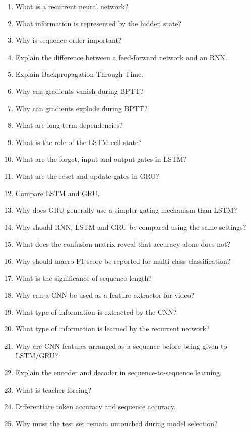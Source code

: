 \documentclass[10pt]{article}
\begin{document}
\begin{enumerate}
\item What is a recurrent neural network?
\item What information is represented by the hidden state?
\item Why is sequence order important?
\item Explain the difference between a feed-forward network and an RNN.
\item Explain Backpropagation Through Time.
\item Why can gradients vanish during BPTT?
\item Why can gradients explode during BPTT?
\item What are long-term dependencies?
\item What is the role of the LSTM cell state?
\item What are the forget, input and output gates in LSTM?
\item What are the reset and update gates in GRU?
\item Compare LSTM and GRU.
\item Why does GRU generally use a simpler gating mechanism than LSTM?
\item Why should RNN, LSTM and GRU be compared using the same settings?
\item What does the confusion matrix reveal that accuracy alone does not?
\item Why should macro F1-score be reported for multi-class classification?
\item What is the significance of sequence length?
\item Why can a CNN be used as a feature extractor for video?
\item What type of information is extracted by the CNN?
\item What type of information is learned by the recurrent network?
\item Why are CNN features arranged as a sequence before being given to LSTM/GRU?
\item Explain the encoder and decoder in sequence-to-sequence learning.
\item What is teacher forcing?
\item Differentiate token accuracy and sequence accuracy.
\item Why must the test set remain untouched during model selection?
\end{enumerate}

\end{document}
